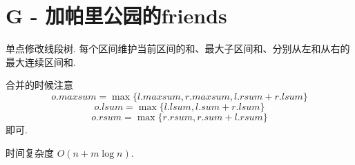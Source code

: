 \documentclass{ctexart}
\begin{document}
\section*{G - 加帕里公园的friends}

单点修改线段树. 每个区间维护当前区间的和、最大子区间和、分别从左和从右的最大连续区间和.

合并的时候注意
\[
    o.maxsum = \max{\{l.maxsum, r.maxsum, l.rsum+r.lsum\}}
\]
\[
    o.lsum = \max{\{l.lsum, l.sum+r.lsum\}}
\]
\[
    o.rsum = \max{\{r.rsum, r.sum+l.rsum\}}
\]
即可.

时间复杂度 $O(n+m\log{n})$.
\end{document}

